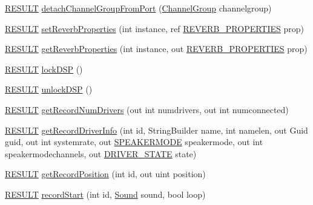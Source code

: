 \begin{DoxyCompactItemize}
\item 
\hyperlink{namespace_f_m_o_d_a305d1176ef3f8c8815861a60407ac33d}{R\+E\+S\+U\+LT} \hyperlink{class_f_m_o_d_1_1_system_af9f0dbec1c2ca7e7c13cd1c058373b39}{detach\+Channel\+Group\+From\+Port} (\hyperlink{class_f_m_o_d_1_1_channel_group}{Channel\+Group} channelgroup)
\item 
\hyperlink{namespace_f_m_o_d_a305d1176ef3f8c8815861a60407ac33d}{R\+E\+S\+U\+LT} \hyperlink{class_f_m_o_d_1_1_system_a9eb6692c2ca8bb093b1d8ce58959927a}{set\+Reverb\+Properties} (int instance, ref \hyperlink{struct_f_m_o_d_1_1_r_e_v_e_r_b___p_r_o_p_e_r_t_i_e_s}{R\+E\+V\+E\+R\+B\+\_\+\+P\+R\+O\+P\+E\+R\+T\+I\+ES} prop)
\item 
\hyperlink{namespace_f_m_o_d_a305d1176ef3f8c8815861a60407ac33d}{R\+E\+S\+U\+LT} \hyperlink{class_f_m_o_d_1_1_system_aef855f81d2ed6a60532da40393d91c84}{get\+Reverb\+Properties} (int instance, out \hyperlink{struct_f_m_o_d_1_1_r_e_v_e_r_b___p_r_o_p_e_r_t_i_e_s}{R\+E\+V\+E\+R\+B\+\_\+\+P\+R\+O\+P\+E\+R\+T\+I\+ES} prop)
\item 
\hyperlink{namespace_f_m_o_d_a305d1176ef3f8c8815861a60407ac33d}{R\+E\+S\+U\+LT} \hyperlink{class_f_m_o_d_1_1_system_a1797d53f2af1ad6d9d97d903e1888feb}{lock\+D\+SP} ()
\item 
\hyperlink{namespace_f_m_o_d_a305d1176ef3f8c8815861a60407ac33d}{R\+E\+S\+U\+LT} \hyperlink{class_f_m_o_d_1_1_system_a3a7e97d6481504ffe16fe6fff0a5a666}{unlock\+D\+SP} ()
\item 
\hyperlink{namespace_f_m_o_d_a305d1176ef3f8c8815861a60407ac33d}{R\+E\+S\+U\+LT} \hyperlink{class_f_m_o_d_1_1_system_ab617c3cd4711e1440af81f997d8b757e}{get\+Record\+Num\+Drivers} (out int numdrivers, out int numconnected)
\item 
\hyperlink{namespace_f_m_o_d_a305d1176ef3f8c8815861a60407ac33d}{R\+E\+S\+U\+LT} \hyperlink{class_f_m_o_d_1_1_system_a2e7455272a4d0a4bedd135153fb34596}{get\+Record\+Driver\+Info} (int id, String\+Builder name, int namelen, out Guid guid, out int systemrate, out \hyperlink{namespace_f_m_o_d_aa0732e7e8efd3b96b526a7f2f8479634}{S\+P\+E\+A\+K\+E\+R\+M\+O\+DE} speakermode, out int speakermodechannels, out \hyperlink{namespace_f_m_o_d_a0fa62396ce674d121c3f766c24942924}{D\+R\+I\+V\+E\+R\+\_\+\+S\+T\+A\+TE} state)
\item 
\hyperlink{namespace_f_m_o_d_a305d1176ef3f8c8815861a60407ac33d}{R\+E\+S\+U\+LT} \hyperlink{class_f_m_o_d_1_1_system_a90c460203b5cc70e1b1d32aac03a81b9}{get\+Record\+Position} (int id, out uint position)
\item 
\hyperlink{namespace_f_m_o_d_a305d1176ef3f8c8815861a60407ac33d}{R\+E\+S\+U\+LT} \hyperlink{class_f_m_o_d_1_1_system_a58f4e2ec23323d8d8487d18d30d3efb4}{record\+Start} (int id, \hyperlink{class_f_m_o_d_1_1_sound}{Sound} sound, bool loop)

\end{DoxyCompactItemize}

